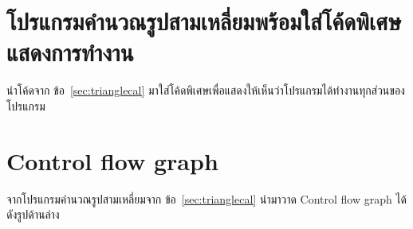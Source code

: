 \documentclass[12pt,a4paper]{article}
\newcommand{\numbername}{ข้อ}
\begin{document}
\newpage
\clearpage
\section[โปรแกรมคำนวณรูปสามเหลี่ยมใส่คำอธิบาย]{โปรแกรมคำนวณรูปสามเหลี่ยมพร้อมใส่โค้ดพิเศษแสดงการทำงาน}
\label{sec:trianglecalinstrumented}
นำโค้ดจาก \numbername~\ref{sec:trianglecal} มาใส่โค้ดพิเศษเพื่อแสดงให้เห็นว่าโปรแกรมได้ทำงานทุกส่วนของโปรแกรม


\newpage
\clearpage
\section{Control flow graph}
จากโปรแกรมคำนวณรูปสามเหลี่ยมจาก \numbername~\ref{sec:trianglecal} นำมาวาด Control flow graph ได้ดังรูปด้านล่าง
\end{document}

